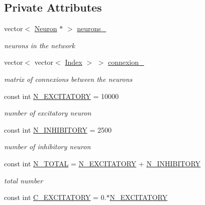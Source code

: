 \subsection*{Private Attributes}
\begin{DoxyCompactItemize}
\item 
vector$<$ \hyperlink{classNeuron}{Neuron} $\ast$ $>$ \hyperlink{classNetwork_a6f71e4eb423d2f8fd9cfa8d5f01cb257}{neurons\-\_\-}
\begin{DoxyCompactList}\small\item\em neurons in the network \end{DoxyCompactList}\item 
vector$<$ vector$<$ \hyperlink{constant_8hpp_a5d7deb06d9443e7d4a47bf078638cc91}{Index} $>$ $>$ \hyperlink{classNetwork_aa6e3e23d543791c50b6010bfb223b12d}{connexion\-\_\-}
\begin{DoxyCompactList}\small\item\em matrix of connexions between the neurons \end{DoxyCompactList}\item 
const int \hyperlink{classNetwork_afdc85e896d66ebb7c03e5f084fe112f4}{N\-\_\-\-E\-X\-C\-I\-T\-A\-T\-O\-R\-Y} = 10000
\begin{DoxyCompactList}\small\item\em number of excitatory neuron \end{DoxyCompactList}\item 
const int \hyperlink{classNetwork_a9194d47c3f0524982ed4be54c5dec78e}{N\-\_\-\-I\-N\-H\-I\-B\-I\-T\-O\-R\-Y} = 2500
\begin{DoxyCompactList}\small\item\em number of inhibitory neuron \end{DoxyCompactList}\item 
const int \hyperlink{classNetwork_a0886932ffef920b0691f563eb9eeb92c}{N\-\_\-\-T\-O\-T\-A\-L} = \hyperlink{classNetwork_afdc85e896d66ebb7c03e5f084fe112f4}{N\-\_\-\-E\-X\-C\-I\-T\-A\-T\-O\-R\-Y} + \hyperlink{classNetwork_a9194d47c3f0524982ed4be54c5dec78e}{N\-\_\-\-I\-N\-H\-I\-B\-I\-T\-O\-R\-Y}
\begin{DoxyCompactList}\small\item\em total number \end{DoxyCompactList}\item 
const int \hyperlink{classNetwork_a5fa178398926b6883c68f9def650341e}{C\-\_\-\-E\-X\-C\-I\-T\-A\-T\-O\-R\-Y} = 0.$\ast$\hyperlink{classNetwork_afdc85e896d66ebb7c03e5f084fe112f4}{N\-\_\-\-E\-X\-C\-I\-T\-A\-T\-O\-R\-Y}

\end{DoxyCompactItemize}
